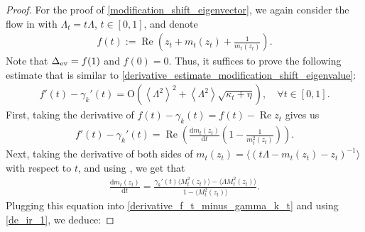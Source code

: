 \documentclass[10pt,reqno]{amsart}
\numberwithin{equation}{section}
\numberwithin{figure}{section}
\theoremstyle{plain} %
\theoremstyle{definition} %
\renewcommand{\txt}[1]{\text{\rm{#1}}}
\newcommand{\p}[1]{({#1})}
\newcommand{\pa}[1]{\left({#1}\right)}
\newcommand{\qa}[1]{\left[{#1}\right]}
\newcommand{\avg}[1]{\langle #1 \rangle}
\newcommand{\avga}[1]{\left\langle #1 \right\rangle}
\DeclareMathOperator{\re}{\mathrm{Re}}
\newcommand{\rd}{\mathrm{d}}
\newcommand{\OO}{\mathrm{O}}
\numberwithin{equation}{section}
\begin{document}
\begin{proof}
For the proof of \eqref{modification_shift_eigenvector}, we again consider the flow in  with $\Lambda_t=t\Lambda$, $t\in \qa{0,1}$, and denote
    \begin{equation}\label{def_shift_f_t}
        \begin{aligned}
            f\p{t}:=\re \pa{z_t+m_t\pa{z_t}+\frac{1}{m_t\pa{z_t}}}.
        \end{aligned}
    \end{equation}
Note that $\Delta_{\txt{ev}}=f\p{1}$ and $f\p{0}=0$. Thus, it suffices to prove the following estimate that is similar to \eqref{derivative_estimate_modification_shift_eigenvalue}:
    \begin{equation}\nonumber
        \begin{aligned}
            f{'}\p{t}-\gamma_k'\p{t}=\OO\pa{\avga{\Lambda^2}^2+\avga{\Lambda^2}\sqrt{\kappa_t+\eta}},\quad \forall t\in [0,1].
        \end{aligned}
    \end{equation}
    First, taking the derivative of $f\p{t}-\gamma_k(t)=f\p{t}-\re z_t$ gives us    \begin{equation}\label{derivative_f_t_minus_gamma_k_t}
        \begin{aligned}
            f{'}\p{t}-\gamma_k'\p{t}=\re \pa{\frac{\rd m_t\p{z_t}}{\rd t}\pa{1-\frac{1}{m_t^2\p{z_t}}}}.
        \end{aligned}
    \end{equation}
    Next, taking the derivative of both sides of 
            \(m_t\p{z_t}=\avg{\p{t\Lambda-m_t\p{z_t}-z_t}^{-1}}\)
    with respect to $t$, and using \smash{$\partial_t z_t=\gamma_k'\pa{t}$}, we get that 
    \begin{equation}\nonumber
        \begin{aligned}
            \frac{\rd m_t\p{z_t}}{\rd t}=\frac{\gamma_k'\p{t}\avg{M_t^2\p{z_t}}-\avg{\Lambda M_t^2\p{z_t}}}{1-\avg{M_t^2\p{z_t}}}.
        \end{aligned}
    \end{equation}
    Plugging this equation into \eqref{derivative_f_t_minus_gamma_k_t} and using \eqref{de_ir_1}, we deduce:

\end{proof}
\end{document}
